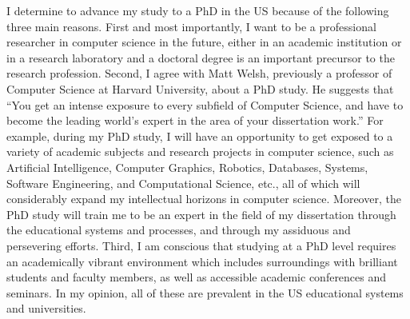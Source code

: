 \documentclass[a4paper,10pt]{report}
\begin{document}
\vspace{0.2cm}
I determine to advance my study to a PhD in the US because of the following three main reasons. First and most importantly, I want to be a professional researcher in computer science in the future, either in an academic institution or in a research laboratory and a doctoral degree is an important precursor to the research profession. Second, I agree with Matt Welsh, previously a professor of Computer Science at Harvard University, about a PhD study. He suggests that ``You get an intense exposure to every subfield of Computer Science, and have to become the leading world's expert in the area of your dissertation work.'' For example, during my PhD study, I will have an opportunity to get exposed to a variety of academic subjects and research projects in computer science, such as Artificial Intelligence, Computer Graphics, Robotics, Databases, Systems, Software Engineering, and Computational Science, etc., all of which will considerably expand my intellectual horizons in computer science. Moreover, the PhD study will train me to be an expert in the field of my dissertation through the educational systems and processes, and through my assiduous and persevering efforts. Third, I am conscious that studying at a PhD level requires an academically vibrant environment which includes surroundings with brilliant students and faculty members, as well as accessible academic conferences and seminars. In my opinion, all of these are prevalent in the US educational systems and universities.
\end{document}
